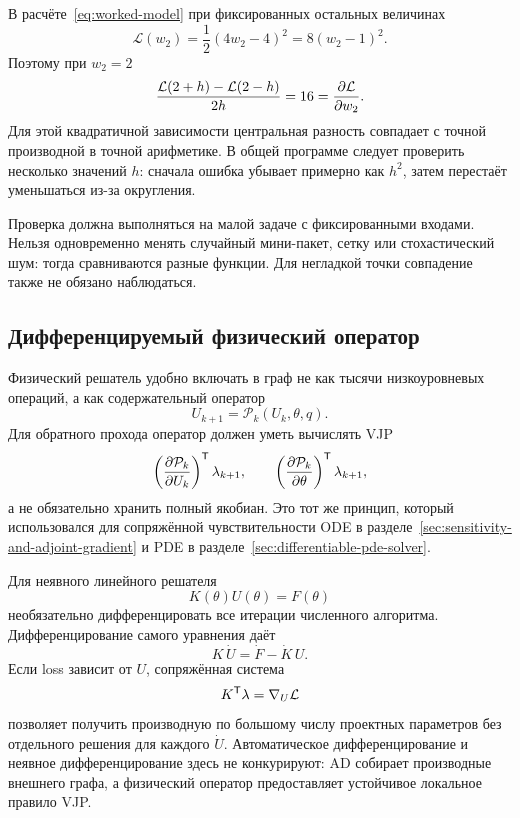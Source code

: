 В расчёте~\eqref{eq:worked-model} при фиксированных остальных величинах
\begin{equation}
 \mathcal L(w_2)
 =
 \frac12(4w_2-4)^2
 =8(w_2-1)^2.
\end{equation}
Поэтому при $w_2=2$
\begin{equation}
 \frac{\mathcal L(2+h)-\mathcal L(2-h)}{2h}
 =16
 =
 \frac{\partial \mathcal L}{\partial w_2}.
\end{equation}
Для этой квадратичной зависимости центральная разность совпадает с точной производной в точной арифметике. В общей программе следует проверить несколько значений $h$: сначала ошибка убывает примерно как $h^2$, затем перестаёт уменьшаться из-за округления.

Проверка должна выполняться на малой задаче с фиксированными входами. Нельзя одновременно менять случайный мини-пакет, сетку или стохастический шум: тогда сравниваются разные функции. Для негладкой точки совпадение также не обязано наблюдаться.

\subsection{Дифференцируемый физический оператор}
Физический решатель удобно включать в граф не как тысячи низкоуровневых операций, а как содержательный оператор
\begin{equation}
 U_{k+1}=\mathcal P_k(U_k,\theta,q).
\end{equation}
Для обратного прохода оператор должен уметь вычислять VJP
\begin{equation}
 \left(\frac{\partial \mathcal P_k}{\partial U_k}\right)^{\mathsf{T}}\lambda_{k+1},
 \qquad
 \left(\frac{\partial \mathcal P_k}{\partial \theta}\right)^{\mathsf{T}}\lambda_{k+1},
\end{equation}
а не обязательно хранить полный якобиан. Это тот же принцип, который использовался для сопряжённой чувствительности ODE в разделе~\ref{sec:sensitivity-and-adjoint-gradient} и PDE в разделе~\ref{sec:differentiable-pde-solver}.

Для неявного линейного решателя
\begin{equation}
 K(\theta)U(\theta)=F(\theta)
\end{equation}
необязательно дифференцировать все итерации численного алгоритма. Дифференцирование самого уравнения даёт
\begin{equation}
 K\,\dot U
 =
 \dot F-\dot K\,U.
\end{equation}
Если loss зависит от $U$, сопряжённая система
\begin{equation}
 K^{\mathsf{T}}\lambda
 =
 \nabla_U\mathcal L
\end{equation}
позволяет получить производную по большому числу проектных параметров без отдельного решения для каждого $\dot U$. Автоматическое дифференцирование и неявное дифференцирование здесь не конкурируют: AD собирает производные внешнего графа, а физический оператор предоставляет устойчивое локальное правило VJP.

